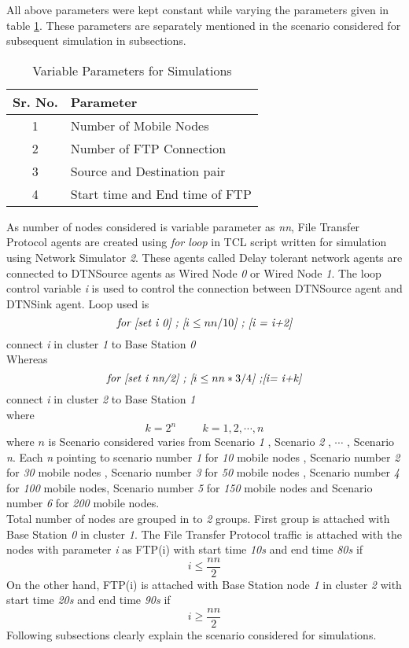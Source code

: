 \documentclass[3p,times]{elsarticle}
\begin{document}
All above parameters were kept constant while varying the parameters given in table \ref {t2}. These parameters are separately mentioned in the scenario considered for subsequent simulation in subsections.
\begin{table}[b]
\centering
\caption{Variable Parameters for Simulations}
\begin{tabular}{|c|l|}
\hline
Sr. No. & Parameter \\
\hline
1 & Number of Mobile Nodes \\
2 & Number of FTP Connection \\
3 & Source and Destination pair \\
4 & Start time and End time of FTP \\
\hline
\end{tabular}
\label{t2}
\end{table}
As number of nodes considered is variable parameter as \emph{nn}, File Transfer Protocol agents are created using \emph{for loop} in TCL script written for simulation using Network Simulator \emph{2}. These agents called Delay tolerant network agents are connected to DTNSource agents as Wired Node \emph{0} or Wired Node \emph{1}. The loop control variable \emph{i} is used to control the connection between DTNSource agent and DTNSink agent. Loop used is \\
$$\emph{for [set i 0] ; [$i \le nn/10$] ; [i = i+2]}$$ connect \emph{i} in  cluster \emph{1} to Base Station \emph{0} \\
Whereas
$$\emph{for [set i nn/2] ; [$i \le nn*3/4$] ;[i= i+k]}$$ connect \emph{i} in  cluster \emph{2} to Base Station \emph{1} \\
where  $$k= 2^n  \hspace{1cm}  k = 1,2, \cdots , n $$ where $n$ is Scenario considered varies from  Scenario \emph{1} , Scenario  \emph{2} , $\cdots$  , Scenario  \emph{n}. Each \emph{n} pointing to scenario number 
\emph{1} for  \emph{10} mobile nodes , Scenario number  \emph{2} for \emph{30} mobile nodes , Scenario number \emph{3} for \emph{50} mobile nodes , Scenario number \emph{4} for \emph{100} mobile nodes, Scenario number \emph{5} for \emph{150} mobile nodes and Scenario number \emph{6} for \emph{200} mobile nodes. \\
Total number of nodes are grouped in to \emph{2} groups. First group is attached with Base Station \emph{0} in cluster \emph{1}. The File Transfer Protocol traffic is attached with the nodes with parameter \emph{i} as FTP(i) with start time \emph{10s} and end time \emph{80s} if $$i \le \frac{nn}{2}$$ On the other hand, FTP(i) is attached with Base Station node \emph{1} in cluster \emph{2} with start time \emph{20s} and end time \emph{90s} if $$i \ge \frac{nn}{2}$$ Following subsections clearly explain the scenario considered for simulations.
\end{document}

